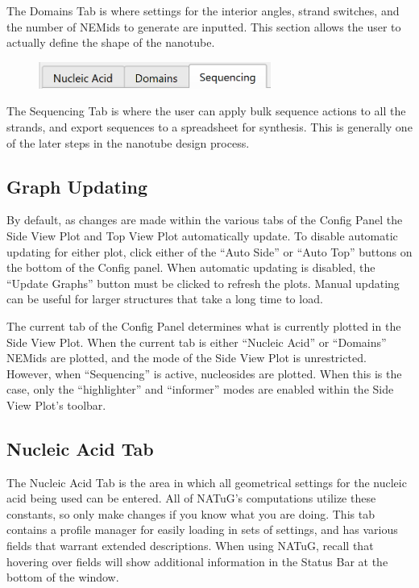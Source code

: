 \documentclass[titlepage]{article}
\begin{document}
	The Domains Tab is where settings for the interior angles, strand switches, and the number of NEMids to generate are inputted. This section allows the user to actually define the shape of the nanotube.

	\begin{figure}[h]
		\centering
		\includegraphics[width=3in]{"sequencing-tab-activated.png"}
		\label{fig:sequencing-activated}
	\end{figure}

	The Sequencing Tab is where the user can apply bulk sequence actions to all the strands, and export sequences to a spreadsheet for synthesis. This is generally one of the later steps in the nanotube design process.
	
	\subsection{Graph Updating}
	
	By default, as changes are made within the various tabs of the Config Panel the Side View Plot and Top View Plot automatically update. To disable automatic updating for either plot, click either of the “Auto Side” or “Auto Top” buttons on the bottom of the Config panel. When automatic updating is disabled, the “Update Graphs” button must be clicked to refresh the plots. Manual updating can be useful for larger structures that take a long time to load.
	
	The current tab of the Config Panel determines what is currently plotted in the Side View Plot. When the current tab is either “Nucleic Acid” or “Domains” NEMids are plotted, and the mode of the Side View Plot is unrestricted. However, when “Sequencing” is active, nucleosides are plotted. When this is the case, only the “highlighter” and “informer” modes are enabled within the Side View Plot’s toolbar.
	
	\subsection{Nucleic Acid Tab} \label{sect:nucleic-acid-tab}
	
	The Nucleic Acid Tab is the area in which all geometrical settings for the nucleic acid being used can be entered. All of NATuG’s computations utilize these constants, so only make changes if you know what you are doing. This tab contains a profile manager for easily loading in sets of settings, and has various fields that warrant extended descriptions. When using NATuG, recall that hovering over fields will show additional information in the Status Bar at the bottom of the window.
	
\end{document}
